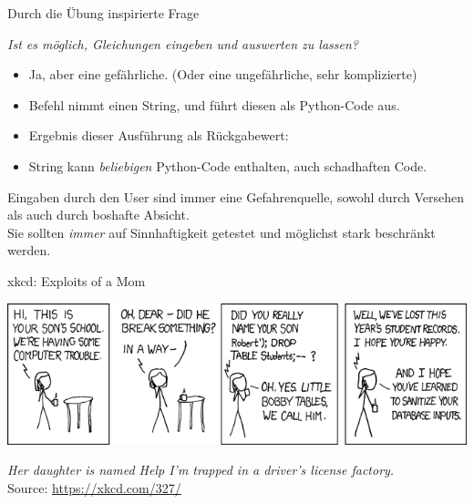 
\begin{frame}[fragile]{Durch die Übung inspirierte Frage}
%
\begin{center}
	\begin{Large}
	\emph{Ist es möglich, Gleichungen eingeben und auswerten zu lassen?}
	\end{Large}
\end{center}
%
\begin{itemize}
\item Ja, aber eine gefährliche. (Oder eine ungefährliche, sehr komplizierte)
\item Befehl  nimmt einen String, und führt diesen als Python-Code aus.
\item Ergebnis dieser Ausführung als Rückgabewert: 
\item String kann \emph{beliebigen} Python-Code enthalten, auch schadhaften Code.
\end{itemize}
%
\begin{warnbox}
Eingaben durch den User sind immer eine Gefahrenquelle, sowohl durch Versehen als auch durch boshafte Absicht.\\
Sie sollten \emph{immer} auf Sinnhaftigkeit getestet und möglichst stark beschränkt werden.
\end{warnbox}
%
\end{frame}


\begin{frame}{xkcd: Exploits of a Mom}
%
\begin{center}
	\includegraphics[width=.8\linewidth]{./gfx/xkcd-codeInjection}\\
	\vspace{3pt}
	
	\scriptsize \emph{Her daughter is named Help I'm trapped in a driver's license factory.}
	\vspace{6pt}\\
	
	Source: \url{https://xkcd.com/327/}
\end{center}
%
\end{frame}

